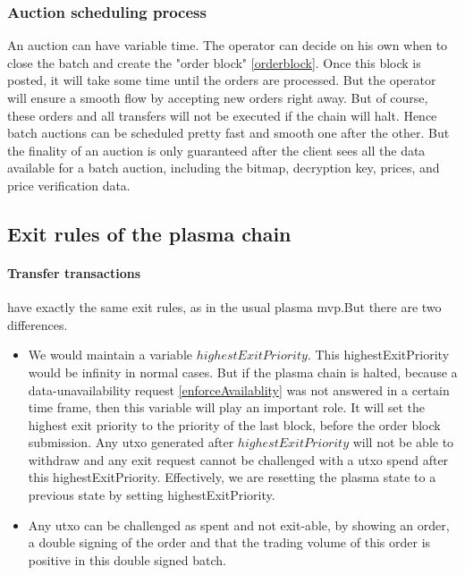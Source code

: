 \documentclass[11pt,parskip=full]{scrartcl}%
\begin{document}
\subsubsection{Auction scheduling process}
An auction can have variable time.
The operator can decide on his own when to close the batch and create the "order block" \ref{orderblock}.
Once this block is posted, it will take some time until the orders are processed.
But the operator will ensure a smooth flow by accepting new orders right away.
But of course, these orders and all transfers will not be executed if the chain will halt.
Hence batch auctions can be scheduled pretty fast and smooth one after the other.
But the finality of an auction is only guaranteed after the client sees all the data available for a batch auction, including the bitmap, decryption key, prices, and price verification data.

\subsection{Exit rules of the plasma chain}
\label{exitRules}
\paragraph{Transfer transactions} have exactly the same exit rules, as in the usual plasma mvp.But there are two differences.
\begin{itemize}
 \item We would maintain a variable $highestExitPriority$.
This highestExitPriority would be infinity in normal cases.
But if the plasma chain is halted, because a data-unavailability request \ref{enforceAvailablity} was not answered in a certain time frame, then this variable will play an important role.
It will set the highest exit priority to the priority of the last block, before the order block submission.
Any utxo generated after $highestExitPriority$ will not be able to withdraw and any exit request cannot be challenged with a utxo spend after this highestExitPriority.
Effectively, we are resetting the plasma state to a previous state by setting highestExitPriority.
\item Any utxo can be challenged as spent and not exit-able, by showing an order, a double signing of the order and that the trading volume of this order is positive in this double signed batch.
\end{itemize}
\end{document}
